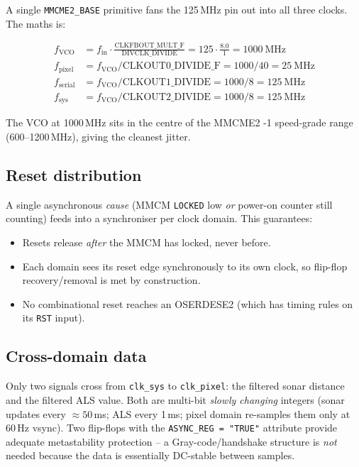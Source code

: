 \documentclass[11pt,a4paper]{article}
\begin{document}
A single \texttt{MMCME2\_BASE} primitive fans the 125\,MHz pin out into
all three clocks.  The maths is:

\begin{align*}
  f_{\text{VCO}} &= f_{\text{in}} \cdot \frac{\text{CLKFBOUT\_MULT\_F}}{\text{DIVCLK\_DIVIDE}}
                  = 125 \cdot \frac{8.0}{1} = 1000~\text{MHz}\\
  f_{\text{pixel}}  &= f_{\text{VCO}} / \text{CLKOUT0\_DIVIDE\_F}  = 1000 / 40   = 25~\text{MHz}\\
  f_{\text{serial}} &= f_{\text{VCO}} / \text{CLKOUT1\_DIVIDE}     = 1000 / 8    = 125~\text{MHz}\\
  f_{\text{sys}}    &= f_{\text{VCO}} / \text{CLKOUT2\_DIVIDE}     = 1000 / 8    = 125~\text{MHz}
\end{align*}

The VCO at 1000\,MHz sits in the centre of the MMCME2 -1
speed-grade range (600--1200\,MHz), giving the cleanest jitter.

\subsection{Reset distribution}

A single asynchronous \emph{cause} (MMCM \texttt{LOCKED} low \emph{or}
power-on counter still counting) feeds into a synchroniser per clock
domain.  This guarantees:

\begin{itemize}
  \item Resets release \emph{after} the MMCM has locked, never before.
  \item Each domain sees its reset edge synchronously to its own clock,
        so flip-flop recovery/removal is met by construction.
  \item No combinational reset reaches an OSERDESE2 (which has timing
        rules on its \texttt{RST} input).
\end{itemize}

\subsection{Cross-domain data}

Only two signals cross from \texttt{clk\_sys} to \texttt{clk\_pixel}: the
filtered sonar distance and the filtered ALS value.  Both are
multi-bit \emph{slowly changing} integers (sonar updates every
$\approx 50$\,ms; ALS every 1\,ms; pixel domain re-samples them only at
60\,Hz vsync).  Two flip-flops with the
\texttt{ASYNC\_REG = "TRUE"} attribute provide adequate
metastability protection -- a Gray-code/handshake structure is
\emph{not} needed because the data is essentially DC-stable between
samples.
\end{document}

